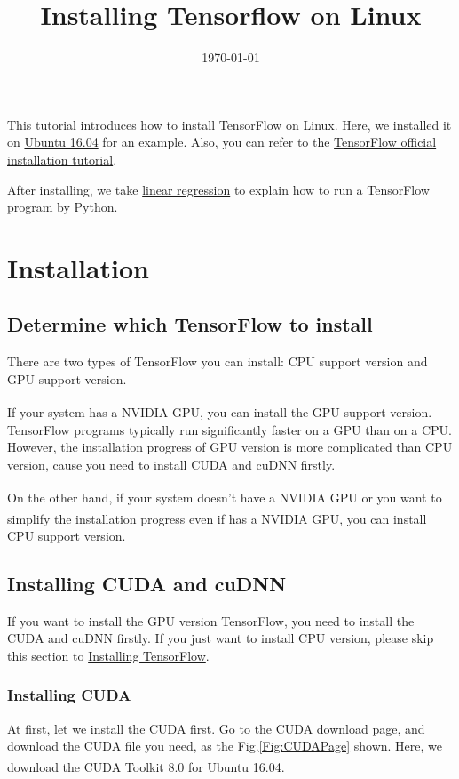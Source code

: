 \documentclass[12pt,letterpaper]{article}
\title{\LARGE Installing Tensorflow on Linux}
\date{\today}
\begin{document}
	\maketitle
	
	This tutorial introduces how to install TensorFlow on Linux. Here, we installed it on \href{https://www.ubuntu.com/download/desktop}{Ubuntu 16.04} for an example. Also, you can refer to the \href{https://www.tensorflow.org/install/install_linux}{TensorFlow official installation tutorial}. \par
	After installing, we take \hyperref[sec:LinearReg]{linear regression} to explain how to run a TensorFlow program by Python.
	
	\section{Installation}
	\subsection{Determine which TensorFlow to install} \par
	
	There are two types of TensorFlow you can install: CPU support version and GPU support version.\par
	If your system has a NVIDIA\textsuperscript{\textregistered} GPU, you can install the GPU support version. TensorFlow programs typically run significantly faster on a GPU than on a CPU. However, the installation progress of GPU version is more complicated than CPU version, cause you need to install CUDA and cuDNN firstly. \par
	
	On the other hand, if your system doesn't have a NVIDIA\textsuperscript{\textregistered} GPU or you want to simplify the installation progress even if  has a NVIDIA\textsuperscript{\textregistered} GPU, you can install CPU support version.
	
	\subsection{Installing CUDA and cuDNN}
	If you want to install the GPU version TensorFlow, you need to install the CUDA and cuDNN firstly. If you just want to install CPU version, please skip this section to \hyperref[sec:InstallationTensorFlow]{Installing TensorFlow}. \par
	
	\subsubsection{Installing CUDA}
	At first, let we install the CUDA first. Go to the \href{https://developer.nvidia.com/cuda-downloads}{CUDA download page}, and download the CUDA file you need, as the Fig.\ref{Fig:CUDAPage} shown. Here, we download the CUDA\textsuperscript{\textregistered} Toolkit 8.0 for Ubuntu 16.04.
	
\end{document}
